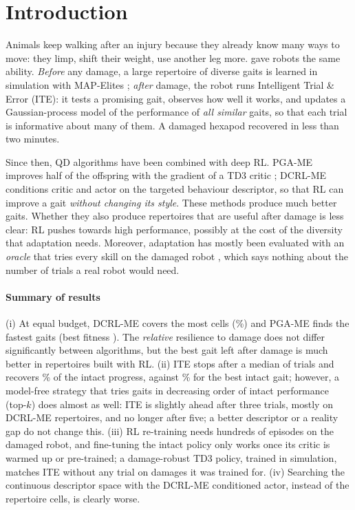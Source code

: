 \documentclass[11pt,a4paper]{article}
\newcommand{\PGA}{PGA-ME}
\newcommand{\DCRL}{DCRL-ME}
\begin{document}
\tableofcontents


\section{Introduction}
Animals keep walking after an injury because they already know many ways to move: they limp, shift their weight,
use another leg more. \citet{cully2015robots} gave robots the same ability. \emph{Before} any damage, a large
repertoire of diverse gaits is learned in simulation with MAP-Elites \citep{mouret2015illuminating}; \emph{after}
damage, the robot runs Intelligent Trial \& Error (ITE): it tests a promising gait, observes how well it works,
and updates a Gaussian-process model of the performance of \emph{all similar} gaits, so that each trial is
informative about many of them. A damaged hexapod recovered in less than two minutes.

Since then, QD algorithms have been combined with deep RL. PGA-ME \citep{nilsson2021policy} improves half of
the offspring with the gradient of a TD3 critic \citep{fujimoto2018addressing}; DCRL-ME
\citep{faldor2024synergizing} conditions critic and actor on the targeted behaviour descriptor, so that RL can
improve a gait \emph{without changing its style}. These methods produce much better gaits. Whether they also
produce repertoires that are useful after damage is less clear: RL pushes towards high performance, possibly at
the cost of the diversity that adaptation needs. Moreover, adaptation has mostly been evaluated with an
\emph{oracle} that tries every skill on the damaged robot \citep{chalumeau2023neuroevolution}, which says nothing
about the number of trials a real robot would need.

\paragraph{Summary of results} (i) At equal budget, \DCRL{} covers the most cells (\CovDCRL\%) and \PGA{} finds the
fastest gaits (best fitness \MaxFitPGA). The \emph{relative} resilience to damage does not differ significantly between
algorithms, but the best gait left after damage is much better in repertoires built with RL. (ii) ITE stops after a
median of \ITETrials{} trials and recovers \ITEPctIntact\% of the intact progress, against \BestIntactPct\% for the
best intact gait; however, a model-free strategy that tries gaits in decreasing order of intact performance (top-$k$)
does almost as well: ITE is slightly ahead after three trials, mostly on \DCRL{} repertoires, and no longer after
five; a better descriptor or a reality gap do not change this. (iii) RL re-training needs hundreds of episodes on the
damaged robot, and fine-tuning the intact policy only works once its critic is warmed up or pre-trained; a
damage-robust TD3 policy, trained in simulation, matches ITE without any trial on damages it was trained for.
(iv) Searching the continuous descriptor space with the \DCRL{}
conditioned actor, instead of the repertoire cells, is clearly worse.
\end{document}
